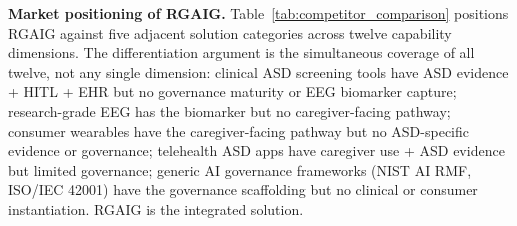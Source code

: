 \noindent\textbf{Market positioning of RGAIG.} Table~\ref{tab:competitor_comparison} positions RGAIG against five adjacent solution categories across twelve capability dimensions. The differentiation argument is the simultaneous coverage of all twelve, not any single dimension: clinical ASD screening tools have ASD evidence + HITL + EHR but no governance maturity or EEG biomarker capture; research-grade EEG has the biomarker but no caregiver-facing pathway; consumer wearables have the caregiver-facing pathway but no ASD-specific evidence or governance; telehealth ASD apps have caregiver use + ASD evidence but limited governance; generic AI governance frameworks (NIST AI RMF, ISO/IEC 42001) have the governance scaffolding but no clinical or consumer instantiation. RGAIG is the integrated solution.



